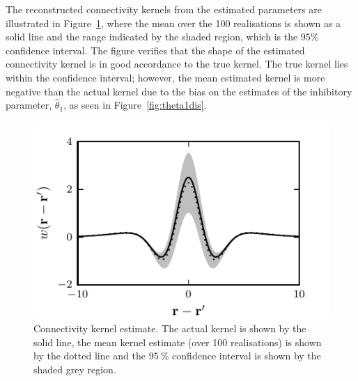 \documentclass[10pt,a4paper]{article}
\begin{document}
The reconstructed connectivity kernels from the estimated parameters are illustrated in Figure~\ref{fig:KernelEstimates}, where the mean over the 100 realisations is shown as a solid line and the range indicated by the shaded region, which is  the $95\%$ confidence interval. The figure verifies that the shape of the estimated connectivity kernel is in good accordance to the true kernel. The true kernel lies within the confidence interval; however, the mean estimated kernel is more negative than the actual kernel due to the bias on the estimates of the inhibitory parameter, $\hat\theta_1$, as seen in Figure~\ref{fig:theta1dis}.
\begin{figure}
    \centering
\includegraphics{./Graph/KernelEstimate.pdf}%
\caption{Connectivity kernel estimate. The actual kernel is shown by the solid line, the mean kernel estimate (over 100 realisations) is shown by the dotted line and the $95~\%$ confidence interval is shown by the shaded grey region.}
\label{fig:KernelEstimates}
\end{figure}
\end{document}
